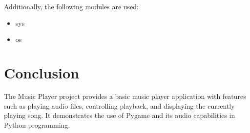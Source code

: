 \documentclass[journal,12pt,twocolumn]{IEEEtran}
\begin{document}
Additionally, the following modules are used:

\begin{itemize}
        \item sys
        \item os
\end{itemize}

\section{Conclusion}
The Music Player project provides a basic music player application with features such as playing audio files, controlling playback, and displaying the currently playing song. It demonstrates the use of Pygame and its audio capabilities in Python programming.
\end{document}
